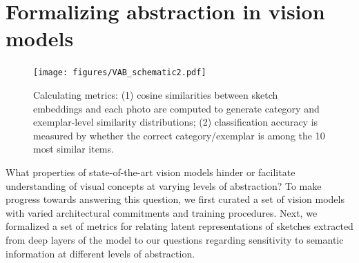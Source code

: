 \documentclass[10pt,letterpaper]{article}
\begin{document}
\section{Formalizing abstraction in vision models}
\begin{figure}[ht!]
    \centering
    \texttt{[image: figures/VAB\_schematic2.pdf]}
     \vspace{-1em}
    \caption{Calculating metrics: (1) cosine similarities between sketch embeddings and each photo are computed to generate category and exemplar-level similarity distributions; (2) classification accuracy is measured by whether the correct category/exemplar is among the 10 most similar items.
    }
    \vspace{-1em}
    \label{fig:_}
    \vspace{-0.5em}
\end{figure}

What properties of state-of-the-art vision models hinder or facilitate understanding of visual concepts at varying levels of abstraction? 
To make progress towards answering this question, we first curated a set of vision models with varied architectural commitments and training procedures. 
Next, we formalized a set of metrics for relating latent representations of sketches extracted from deep layers of the model to our questions regarding sensitivity to semantic information at different levels of abstraction.


\end{document}
